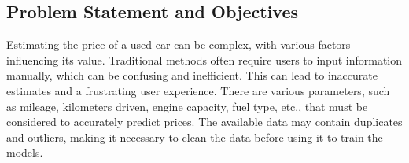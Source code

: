 \documentclass[a4paper,12pt]{article}
\begin{document}
\begin{titlepage}
\section*{Problem Statement and Objectives}
\begin{justify}
Estimating the price of a used car can be complex, with various factors influencing its value. Traditional methods often require users to input information manually, which can be confusing and inefficient. This can lead to inaccurate estimates and a frustrating user experience.
There are various parameters, such as mileage, kilometers driven, engine capacity, fuel type, etc., that must be considered to accurately predict prices. The available data may contain duplicates and outliers, making it necessary to clean the data before using it to train the models. 


\end{justify}

\end{titlepage}

\newpage
\end{document}
